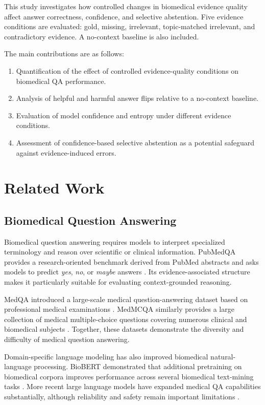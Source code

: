 \documentclass[conference]{IEEEtran}
\begin{document}
This study investigates how controlled changes in biomedical evidence quality affect answer correctness, confidence, and selective abstention. Five evidence conditions are evaluated: gold, missing, irrelevant, topic-matched irrelevant, and contradictory evidence. A no-context baseline is also included.

The main contributions are as follows:

\begin{enumerate}
    \item Quantification of the effect of controlled evidence-quality conditions on biomedical QA performance.
    \item Analysis of helpful and harmful answer flips relative to a no-context baseline.
    \item Evaluation of model confidence and entropy under different evidence conditions.
    \item Assessment of confidence-based selective abstention as a potential safeguard against evidence-induced errors.
\end{enumerate}

\section{Related Work}

\subsection{Biomedical Question Answering}

Biomedical question answering requires models to interpret specialized terminology and reason over scientific or clinical information. PubMedQA provides a research-oriented benchmark derived from PubMed abstracts and asks models to predict \textit{yes}, \textit{no}, or \textit{maybe} answers \cite{jin2019pubmedqa}. Its evidence-associated structure makes it particularly suitable for evaluating context-grounded reasoning.

MedQA introduced a large-scale medical question-answering dataset based on professional medical examinations \cite{jin2021medqa}. MedMCQA similarly provides a large collection of medical multiple-choice questions covering numerous clinical and biomedical subjects \cite{pal2022medmcqa}. Together, these datasets demonstrate the diversity and difficulty of medical question answering.

Domain-specific language modeling has also improved biomedical natural-language processing. BioBERT demonstrated that additional pretraining on biomedical corpora improves performance across several biomedical text-mining tasks \cite{lee2020biobert}. More recent large language models have expanded medical QA capabilities substantially, although reliability and safety remain important limitations \cite{singhal2023clinical}.
\end{document}
